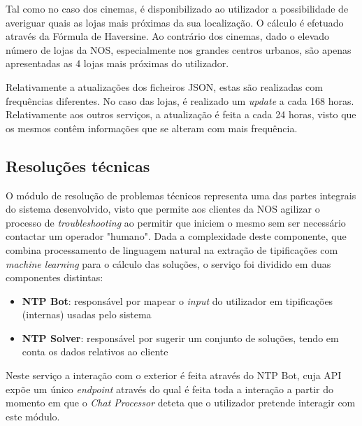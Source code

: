\documentclass[11pt,a4paper]{article}
\begin{document}
Tal como no caso dos cinemas, é disponibilizado ao utilizador a possibilidade de averiguar quais as lojas
mais próximas da sua localização. O cálculo é efetuado através da Fórmula de Haversine. Ao contrário dos
cinemas, dado o elevado número de lojas da NOS, especialmente nos grandes centros urbanos, são apenas
apresentadas as 4 lojas mais próximas do utilizador.

Relativamente a atualizações dos ficheiros JSON, estas são realizadas com frequências diferentes. No caso
das lojas, é realizado um \textit{update} a cada 168 horas. Relativamente aos outros serviços, a atualização
é feita a cada 24 horas, visto que os mesmos contêm informações que se alteram com mais frequência.


\subsection{Resoluções técnicas}\label{sec:resTec}
O módulo de resolução de problemas técnicos representa uma das partes integrais do sistema desenvolvido,
visto que permite aos clientes da NOS agilizar o processo de \textit{troubleshooting} ao permitir que
iniciem o mesmo sem ser necessário contactar um operador "humano". Dada a complexidade deste componente,
que combina processamento de linguagem natural na extração de tipificações com \textit{machine learning}
para o cálculo das soluções, o serviço foi dividido em duas componentes distintas:

\begin{itemize}
    \item \textbf{NTP Bot}: responsável por mapear o \textit{input} do utilizador em tipificações (internas)
    usadas pelo sistema
    \item \textbf{NTP Solver}: responsável por sugerir um conjunto de soluções, tendo em conta os dados relativos
    ao cliente
\end{itemize}

Neste serviço a interação com o exterior é feita através do NTP Bot, cuja API expõe um único
\textit{endpoint} através do qual é feita toda a interação a partir do momento em que o \textit{Chat Processor}
deteta que o utilizador pretende interagir com este módulo.
\end{document}
